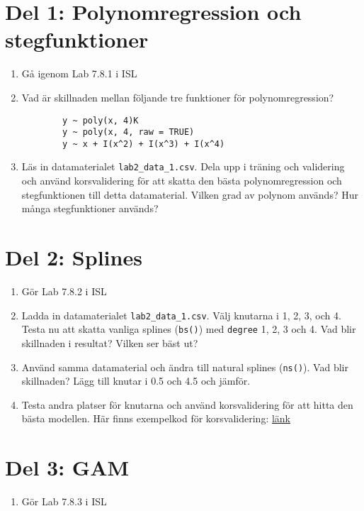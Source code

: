 \documentclass[a4paper]{article}
\begin{document}
\section*{Del 1: Polynomregression och stegfunktioner}

\begin{enumerate}
    \item Gå igenom Lab 7.8.1 i ISL
    \item Vad är skillnaden mellan följande tre funktioner för polynomregression?
    \begin{verbatim}
        y ~ poly(x, 4)K
        y ~ poly(x, 4, raw = TRUE)
        y ~ x + I(x^2) + I(x^3) + I(x^4)
    \end{verbatim}
    \item Läs in datamaterialet \texttt{lab2\_data\_1.csv}. Dela upp i träning och validering och använd korsvalidering för att skatta den bästa polynomregression och stegfunktionen till detta datamaterial. Vilken grad av polynom används? Hur många stegfunktioner används?
\end{enumerate}

\section*{Del 2: Splines}

\begin{enumerate}
    \item Gör Lab 7.8.2 i ISL
    \item Ladda in datamaterialet \texttt{lab2\_data\_1.csv}. Välj knutarna i 1, 2, 3, och 4. Testa nu att skatta vanliga splines (\texttt{bs()}) med \texttt{degree} 1, 2, 3 och 4. Vad blir skillnaden i resultat? Vilken ser bäst ut?
    \item Använd samma datamaterial och ändra till natural splines (\texttt{ns()}). Vad blir skillnaden? Lägg till knutar i 0.5 och 4.5 och jämför.
    \item Testa andra platser för knutarna och använd korsvalidering för att hitta den bästa modellen. Här finns exempelkod för korsvalidering: \href{https://raw.githubusercontent.com/STIMALiU/732G12_DM/master/labs/lab2_cv_code1.R}{länk}
\end{enumerate}

\section*{Del 3: GAM}
\begin{enumerate}
    \item Gör Lab 7.8.3 i ISL
\end{enumerate}
\end{document}
